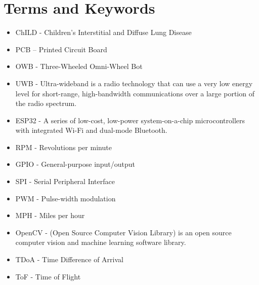 \documentclass{report}
\begin{document}
    \section{Terms and Keywords}
    \begin{itemize}
        \item ChILD - Children's Interstitial and Diffuse Lung Disease
        \item PCB – Printed Circuit Board
        \item OWB - Three-Wheeled Omni-Wheel Bot
        \item UWB - Ultra-wideband is a radio technology that can use a very low energy level for short-range, high-bandwidth communications over a large portion of the radio spectrum.
        \item ESP32 - A series of low-cost, low-power system-on-a-chip microcontrollers with integrated Wi-Fi and dual-mode Bluetooth.
        \item RPM - Revolutions per minute
        \item GPIO - General-purpose input/output
        \item SPI - Serial Peripheral Interface
        \item PWM - Pulse-width modulation
        \item MPH - Miles per hour
        \item OpenCV - (Open Source Computer Vision Library) is an open source computer vision and machine learning software library.
        \item TDoA - Time Difference of Arrival 
        \item ToF - Time of Flight
    \end{itemize}

    
    
\end{document}
